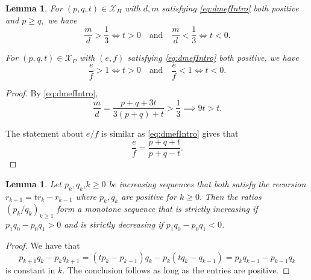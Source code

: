 \documentclass[11pt, reqno]{amsart}
\newtheorem{lemma}[thm]{Lemma}
\theoremstyle{remark}
\numberwithin{equation}{subsection}
\numberwithin{figure}{section}
\theoremstyle{customremark}
\newcommand{\X}{\mathcal{X}}
\begin{document}
  \begin{lemma} \label{lem:md13}
    For $(p,q,t) \in\X_H$ with $d,m$ satisfying \eqref{eq:dmefIntro} both positive and $p \geq q,$ we have
    \[ \frac{m}{d}>\frac{1}{3} \iff t>0 \quad \text{and} \quad \frac{m}{d}<\frac{1}{3} \iff t<0.\] 
     

    For $(p,q,t) \in \X_P$ with $(e,f)$ satisfying \eqref{eq:dmefIntro} both positive, we have 
   \[ \frac{e}{f}>1 \iff t>0 \quad \text{and} \quad \frac{e}{f}<1 \iff t<0.\]     
\end{lemma}
\begin{proof}
    By \eqref{eq:dmefIntro}, 
    \[ \frac{m}{d}=\frac{p+q+3t}{3(p+q)+t} >\frac{1}{3} \implies 9 t>t. \]



      The statement about $e/f$ is similar as \eqref{eq:dmefIntro} gives that 
    \[ \frac{e}{f}=\frac{p+q+ t}{p+q- t}.\]
\end{proof}


\begin{lemma}\label{lem:recurDif}\cite[Cor 3.15]{MM}
    Let $p_k,q_k$,$k \geq 0$ be increasing sequences that both satisfy the recursion $r_{k+1}=tr_k-r_{k-1}$ where $p_k,q_k$ are positive for $k \geq 0.$ Then the ratios $(p_k/q_k)_{k \geq 1}$ form a monotone sequence that is strictly increasing if $p_1q_0-p_0q_1>0$ and is strictly decreasing if $p_1q_0-p_0q_1<0$. 
\end{lemma}
\begin{proof}
    We have that
    \[ p_{k+1}q_k-p_kq_{k+1}=(tp_k-p_{k-1})q_k-p_k(tq_k-q_{k-1})=p_kq_{k-1}-p_{k-1}q_k\]
    is constant in $k.$ The conclusion follows as long as the entries are positive. 
\end{proof}
\end{document}
